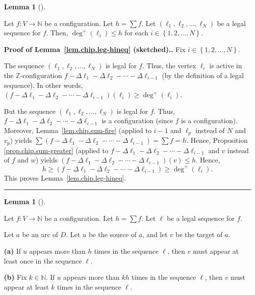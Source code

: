 \documentclass[numbers=enddot,12pt,final,onecolumn,notitlepage]{scrartcl}%
\theoremstyle{definition}
\newtheorem{lem}[theo]{Lemma}
\newenvironment{lemma}[1][]
{\begin{lem}[#1]\begin{leftbar}}
{\end{leftbar}\end{lem}}
\newenvironment{proof}[1][Proof]{\noindent\textbf{#1.} }{\ \rule{0.5em}{0.5em}}
\let\sumnonlimits\sum
\renewcommand{\sum}{\sumnonlimits\limits}
\newcommand{\NN}{\mathbb{N}}
\newcommand{\ZZ}{\mathbb{Z}}
\newcommand{\set}[1]{\left\{ #1 \right\}}
\newcommand{\tup}[1]{\left( #1 \right)}
\begin{document}
\begin{lemma} \label{lem.chip.leg-hineq}
Let $f : V \to \NN$ be a configuration.
Let $h = \sum f$.
Let $\tup{\ell_1, \ell_2, \ldots, \ell_N}$ be a legal sequence for $f$.
Then, $\deg^+ \tup{\ell_i} \leq h$ for each
$i \in \set{1, 2, \ldots, N}$.
\end{lemma}

\begin{proof}[Proof of Lemma~\ref{lem.chip.leg-hineq} (sketched).]
Fix $i\in\left\{  1,2,\ldots,N\right\}  $.

The sequence $\left(  \ell_{1},\ell_{2},\ldots,\ell_{N}\right)  $ is legal for
$f$. Thus, the vertex $\ell_{i}$ is active in the $\ZZ$-configuration
$f-\Delta\ell_{1}-\Delta\ell_{2}-\cdots-\Delta\ell_{i-1}$ (by the definition
of a legal sequence). In other words, $\left(  f-\Delta\ell_{1}-\Delta\ell
_{2}-\cdots-\Delta\ell_{i-1}\right)  \left(  \ell_{i}\right)  \geq\deg
^{+}\left(  \ell_{i}\right)  $.

But the sequence $\left(  \ell_{1},\ell_{2},\ldots,\ell_{N}\right)  $ is legal
for $f$. Thus, $f-\Delta\ell_{1}-\Delta\ell_{2}-\cdots-\Delta\ell_{i-1}$ is a
configuration (since $f$ is a configuration). Moreover,
Lemma~\ref{lem.chip.sum-fire} (applied to $i-1$ and $\ell_p$
instead of $N$ and $v_p$) yields
$\sum\left(  f-\Delta\ell_{1}-\Delta\ell_{2}-\cdots-\Delta\ell_{i-1}\right)
= \sum f =h$.
Hence, Proposition \ref{prop.chip.sum-greater} (applied to $f-\Delta\ell
_{1}-\Delta\ell_{2}-\cdots-\Delta\ell_{i-1}$ and $v$ instead of $f$ and $w$)
yields $\left(  f-\Delta\ell_{1}-\Delta\ell_{2}-\cdots-\Delta\ell
_{i-1}\right)  \left(  v\right)  \leq h$. Hence,%
\[
h\geq\left(  f-\Delta\ell_{1}-\Delta\ell_{2}-\cdots-\Delta\ell_{i-1}\right)
\geq\deg^{+}\left(  \ell_{i}\right)  .
\]
This proves Lemma~\ref{lem.chip.leg-hineq}.
\end{proof}

\begin{lemma} \label{lem.chip.leg-bound1}
Let $f : V \to \NN$ be a configuration.
Let $h = \sum f$.
Let $\ell$ be a legal sequence for $f$.

Let $a$ be an arc of $D$.
Let $u$ be the source of $a$, and let $v$ be the target of $a$.

\textbf{(a)}
If $u$ appears more than $h$ times in the sequence $\ell$,
then $v$ must appear at least once in the sequence $\ell$.

\textbf{(b)}
Fix $k \in \NN$.
If $u$ appears more than $kh$ times in the sequence $\ell$,
then $v$ must appear at least $k$ times in the sequence $\ell$.
\end{lemma}
\end{document}
